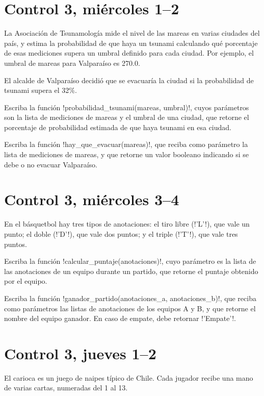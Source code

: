\documentclass[12pt,spanish,a5paper,landscape]{article}
\begin{document}
  \pagestyle{empty}
  \thispagestyle{empty}

  \part*{Control 3, miércoles 1--2}
  \newpage
  La Asociación de Tsunamología mide el nivel de las mareas
  en varias ciudades del país,
  y estima la probabilidad de que haya un tsunami
  calculando qué porcentaje de esas mediciones
  supera un umbral definido para cada ciudad.
  Por ejemplo,
  el umbral de mareas para Valparaíso es 270.0.

  El alcalde de Valparaíso decidió que se evacuaría la ciudad
  si la probabilidad de tsunami supera el 32\%.

  Escriba la función \li!probabilidad_tsunami(mareas, umbral)!,
  cuyos parámetros son la lista de mediciones de mareas
  y el umbral de una ciudad,
  que retorne el porcentaje de probabilidad estimada
  de que haya tsunami en esa ciudad.

  Escriba la función \li!hay_que_evacuar(mareas)!,
  que reciba como parámetro la lista de mediciones de mareas,
  y que retorne un valor booleano
  indicando si se debe o no evacuar Valparaíso.
  

  \newpage
  \part*{Control 3, miércoles 3--4}
  \newpage
  En el básquetbol hay tres tipos de anotaciones:
  el tiro libre (\li!'L'!), que vale un punto;
  el doble (\li!'D'!), que vale dos puntos; y
  el triple (\li!'T'!), que vale tres puntos.

  Escriba la función \li!calcular_puntaje(anotaciones)!,
  cuyo parámetro es la lista de las anotaciones
  de un equipo durante un partido,
  que retorne el puntaje obtenido por el equipo.

  Escriba la función \li!ganador_partido(anotaciones_a, anotaciones_b)!,
  que reciba como parámetros las listas de anotaciones
  de los equipos A y B,
  y que retorne el nombre del equipo ganador.
  En caso de empate,
  debe retornar \li!'Empate'!.

  

  \newpage
  \part*{Control 3, jueves 1--2}
  \newpage
  El carioca es un juego de naipes típico de Chile.
  Cada jugador recibe una mano de varias cartas,
  numeradas del 1 al 13.
\end{document}
